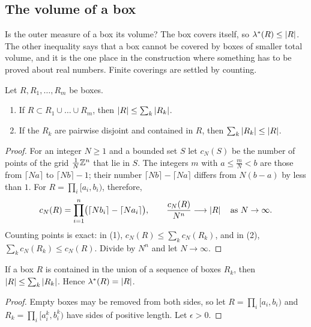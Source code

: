 \begin{notechapter}
\section{The volume of a box}\label{caratheodory:sec:boxes}

Is the outer measure of a box its volume? The box covers itself, so
$\lambda^*(R)\leq\left|R\right|$. The other inequality says that a box cannot
be covered by boxes of smaller total volume, and it is the one place
in the construction where something has to be proved about real
numbers. Finite coverings are settled by counting.

\begin{lemma}\label{caratheodory:lem:finite}
Let $R, R_1, \dots, R_m$ be boxes.
\begin{enumerate}[nosep]
  \item If $R\subset R_1\cup\dots\cup R_m$, then
        $\left|R\right|\leq\sum_k\left|R_k\right|$.
  \item If the $R_k$ are pairwise disjoint and contained in $R$, then
        $\sum_k\left|R_k\right|\leq\left|R\right|$.
\end{enumerate}
\end{lemma}

\begin{proof}
For an integer $N\geq1$ and a bounded set $S$ let $c_N(S)$ be the
number of points of the grid $\frac1N\mathbb{Z}^n$ that lie in $S$. The
integers $m$ with $a\leq\frac mN < b$ are those from $\lceil Na\rceil$
to $\lceil Nb\rceil - 1$; their number
$\lceil Nb\rceil - \lceil Na\rceil$ differs from $N(b - a)$ by less
than $1$. For $R = \prod_i[a_i, b_i)$, therefore,
\[
  c_N(R) = \prod_{i=1}^n
    \bigl(\lceil Nb_i\rceil - \lceil Na_i\rceil\bigr) ,
  \qquad
  \frac{c_N(R)}{N^n}\longrightarrow\left|R\right|
  \quad\text{as }N\to\infty .
\]
Counting points is exact: in (1),
$c_N(R)\leq\sum_kc_N(R_k)$, and in (2),
$\sum_kc_N(R_k)\leq c_N(R)$. Divide by $N^n$ and let $N\to\infty$.
\end{proof}

\begin{theorem}
\label{caratheodory:thm:box}
If a box $R$ is contained in the union of a sequence of boxes $R_k$,
then $\left|R\right|\leq\sum_k\left|R_k\right|$. Hence $\lambda^*(R) = \left|R\right|$.
\end{theorem}

\begin{proof}
Empty boxes may be removed from both sides, so let
$R = \prod_i[a_i, b_i)$ and $R_k = \prod_i[a_i^k, b_i^k)$ have sides of
positive length. Let $\epsilon > 0$.


\end{proof}
\end{notechapter}
